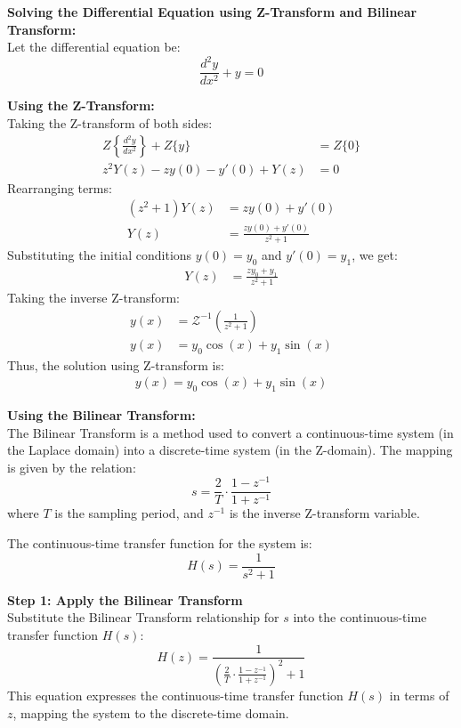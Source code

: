\documentclass[journal]{IEEEtran}
\begin{document}
	\textbf{Solving the Differential Equation using Z-Transform and Bilinear Transform:}\\
	Let the differential equation be:
	\[
	\frac{d^2y}{dx^2} + y = 0
	\]
	
	\textbf{Using the Z-Transform:}\\
	Taking the Z-transform of both sides:
	\begin{align}
		Z\left\{\frac{d^2y}{dx^2}\right\} + Z\{y\} &= Z\{0\} \\
		z^2 Y(z) - z y(0) - y'(0) + Y(z) &= 0
	\end{align}
	Rearranging terms:
	\begin{align}
		(z^2 + 1) Y(z) &= z y(0) + y'(0) \\
		Y(z) &= \frac{z y(0) + y'(0)}{z^2 + 1}
	\end{align}
	Substituting the initial conditions \(y(0) = y_0\) and \(y'(0) = y_1\), we get:
	\begin{align}
		Y(z) &= \frac{z y_0 + y_1}{z^2 + 1}
	\end{align}
	Taking the inverse Z-transform:
	\begin{align}
		y(x) &= \mathcal{Z}^{-1}\left( \frac{1}{z^2 + 1} \right) \\
		y(x) &= y_0 \cos(x) + y_1 \sin(x)
	\end{align}
	Thus, the solution using Z-transform is:
	\begin{align}
		y(x) = y_0 \cos(x) + y_1 \sin(x)
	\end{align}
	
	\textbf{Using the Bilinear Transform:}\\
	The Bilinear Transform is a method used to convert a continuous-time system (in the Laplace domain) into a discrete-time system (in the Z-domain). The mapping is given by the relation:
	\[
	s = \frac{2}{T} \cdot \frac{1 - z^{-1}}{1 + z^{-1}}
	\]
	where \( T \) is the sampling period, and \( z^{-1} \) is the inverse Z-transform variable.
	
	The continuous-time transfer function for the system is:
	\[
	H(s) = \frac{1}{s^2 + 1}
	\]
	
	\textbf{Step 1: Apply the Bilinear Transform}\\
	Substitute the Bilinear Transform relationship for \( s \) into the continuous-time transfer function \( H(s) \):
	\[
	H(z) = \frac{1}{\left( \frac{2}{T} \cdot \frac{1 - z^{-1}}{1 + z^{-1}} \right)^2 + 1}
	\]
	This equation expresses the continuous-time transfer function \( H(s) \) in terms of \( z \), mapping the system to the discrete-time domain.
	
\end{document}
